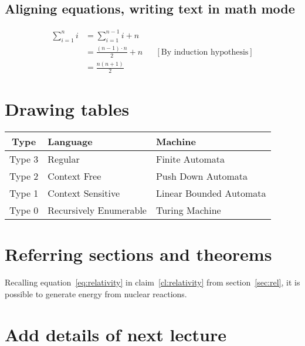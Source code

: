 \subsection{Aligning equations, writing text in math mode}
\begin{align*}
\sum_{i=1}^n i & = \sum_{i=1}^{n-1} i + n \\
			   & = \frac{(n-1)\cdot n}{2} + n && [\text{By induction hypothesis}]\\
			   & = \frac{n(n+1)}{2}
\end{align*}




\section{Drawing tables}
\begin{center}
\begin{tabular}{||c|l|l||}
\hline 
\textbf{Type} & \textbf{Language} & \textbf{Machine} \\ 
\hline \hline
Type 3 & Regular & Finite Automata \\ 
\hline 
Type 2 & Context Free & Push Down Automata \\ 
\hline 
Type 1 & Context Sensitive & Linear Bounded Automata \\ 
\hline
Type 0 & Recursively Enumerable & Turing Machine \\ 
\hline 
\end{tabular} 
\end{center}

\section{Referring sections and theorems}
Recalling equation~\ref{eq:relativity} in claim~\ref{cl:relativity} from section~\ref{sec:rel},
it is possible to generate energy from nuclear reactions.





\section{Add details of next lecture}
